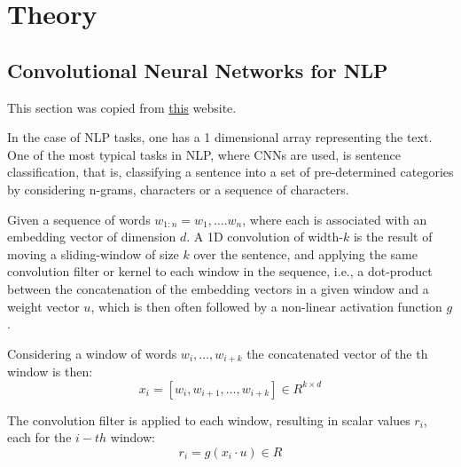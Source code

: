\documentclass[fleqn,10pt]{SelfArx} %
\begin{document}
\section{Theory}

\subsection{Convolutional Neural Networks for NLP}
This section was copied from \href{https://www.davidsbatista.net/blog/2018/03/31/SentenceClassificationConvNets/}{this} website. 

In the case of NLP tasks, one has a 1 dimensional array representing the text. 
One of the most typical tasks in NLP, where CNNs are used, is sentence classification, that is, classifying a sentence into a set of pre-determined categories by considering n-grams, characters or a sequence of characters.

Given a sequence of words $w_{1:n} = w_1, \dots. w_n$, where each is associated with an embedding vector of dimension $d$. A 1D convolution of width-$k$ is the result of moving a sliding-window of size $k$ over the sentence, and applying the same convolution filter or kernel to each window in the sequence, i.e., a dot-product between the concatenation of the embedding vectors in a given window and a weight vector $u$, which is then often followed by a non-linear activation function $g$.

Considering a window of words $w_i, \dots ,w_{i+k}$ the concatenated vector of the th window is then:
\begin{equation}
    x_i = [w_i, w_{i+1}, \dots , w_{i+k}] \in R^{k \times d}
\end{equation}

The convolution filter is applied to each window, resulting in scalar values $r_i$, each for the $i-th$ window:
\begin{equation}
    r_i = g(x_i \cdot u) \in R
\end{equation}
\end{document}
